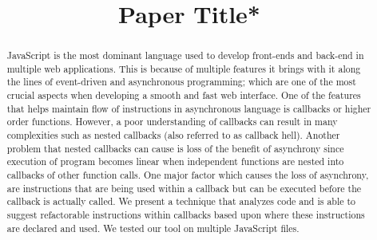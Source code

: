 \documentclass[10pt,conference]{IEEEtran}
\begin{document}
\title{Paper Title*\\
}
\author{
\and
{}
\and
{}
}

\maketitle

\begin{abstract}
JavaScript is the most dominant language used to develop front-ends and back-end in multiple web applications. This is because of multiple features it brings with it along the lines of event-driven and asynchronous programming; which are one of the most crucial aspects when developing a smooth and fast web interface. One of the features that helps maintain flow of instructions in asynchronous language is callbacks or higher order functions. However, a poor understanding of callbacks can result in many complexities such as nested callbacks (also referred to as callback hell). Another problem that nested callbacks can cause is loss of the benefit of asynchrony since execution of program becomes linear when independent functions are nested into callbacks of other function calls. One major factor which causes the loss of asynchrony, are instructions that are being used within a callback but can be executed before the callback is actually called. We present a technique that analyzes code and is able to suggest refactorable instructions within callbacks based upon where these instructions are declared and used. We tested our tool on multiple JavaScript files.
\end{abstract}
\end{document}
